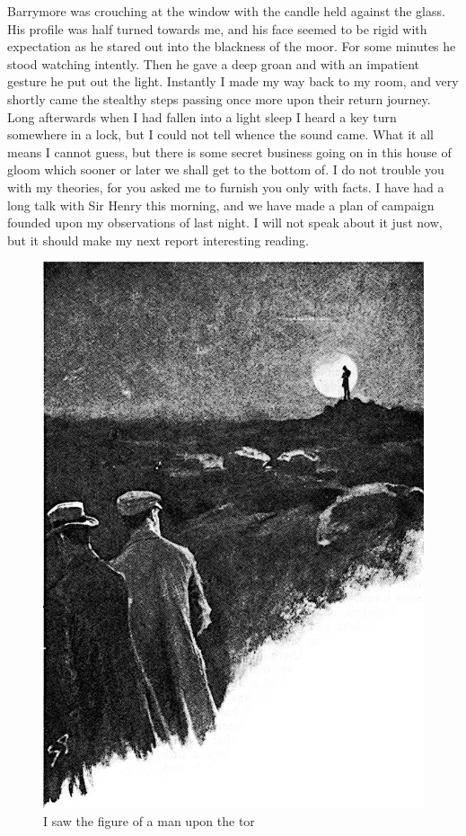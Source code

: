 \documentclass[paper=5.5in:8.5in,BCOR=7mm,twoside,DIV=calc,12pt,usegeometry,openany,chapterprefix,endperiod,headings=big]{scrbook} %
\begin{document}
Barrymore was crouching at the window with the candle held against the glass. His profile was half turned towards me, and his face seemed to be rigid with expectation as he stared out into the blackness of the moor. For some minutes he stood watching intently. Then he gave a deep groan and with an impatient gesture he put out the light. Instantly I made my way back to my room, and very shortly came the stealthy steps passing once more upon their return journey. Long afterwards when I had fallen into a light sleep I heard a key turn somewhere in a lock, but I could not tell whence the sound came. What it all means I cannot guess, but there is some secret business going on in this house of gloom which sooner or later we shall get to the bottom of. I do not trouble you with my theories, for you asked me to furnish you only with facts. I have had a long talk with Sir Henry this morning, and we have made a plan of campaign founded upon my observations of last night. I will not speak about it just now, but it should make my next report interesting reading.
\clearpage
\vfill
\begin{figure}[tbph]
\centering
\includegraphics[width=\linewidth]{09_manontor}
\caption{I saw the figure of a man upon the tor}
\end{figure}
\vfill
\thispagestyle{empty}
\clearpage
\end{document}
